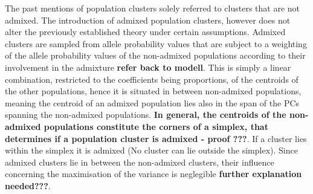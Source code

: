 \documentclass[a4paper, 11pt]{article}
\begin{document}
The past mentions of population clusters solely referred to clusters that are not admixed. The introduction of admixed population clusters, however does not alter the previously established theory under certain assumptions. Admixed clusters are sampled from allele probability values that are subject to a weighting of the allele probability values of the non-admixed populations according to their involvement in the admixture \textbf{refer back to modell}. This is simply a linear combination, restricted to the coefficients being proportions, of the centroids of the other populations, hence it is situated in between non-admixed populations, meaning the centroid of an admixed population lies also in the span of the PCs spanning the non-admixed populations. \textbf{In general, the centroids of the non-admixed populations constitute the corners of a simplex, that determines if a population cluster is admixed - proof ???}. If a cluster lies within the simplex it is admixed (No cluster can lie outside the simplex). Since admixed clusters lie in between the non-admixed clusters, their influence concerning the maximisation of the variance is neglegible \textbf{further explanation needed???}.
\end{document}
